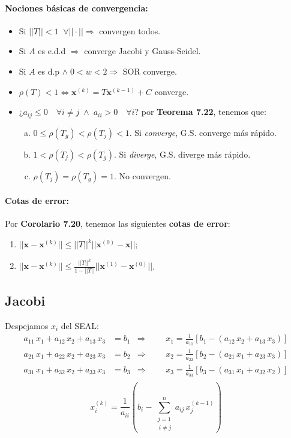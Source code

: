\documentclass[10pt,a4paper]{article}
\begin{document}
\paragraph{Nociones básicas de convergencia:}
\begin{itemize}
\item Si $||T||<1 \;\; \forall ||\cdot|| \Rightarrow$ convergen todos.
\item Si $A$ es e.d.d $\Rightarrow$ converge Jacobi y Gauss-Seidel.
\item Si $A$ es d.p $\wedge\; 0<w<2 \Rightarrow$ SOR converge.
\item $\rho (T) < 1 \iff \mathbf{x}^{(k)}=T\mathbf{x}^{(k-1)} + C$ converge. 
\item ¿$a_{ij} \leq 0 \quad \forall i\neq j \; \wedge \; a_{ii}>0 \quad \forall i$? por \textbf{Teorema 7.22}, tenemos que:
\begin{enumerate}[a.]
\item $0 \leq \rho(T_g) < \rho(T_j)<1$. Si \textit{converge}, G.S. converge más rápido.
\item $1 < \rho(T_j) < \rho (T_g)$. Si \textit{diverge}, G.S. diverge más rápido.
\item $\rho(T_j) = \rho(T_g) = 1$. No convergen.
\end{enumerate}
\end{itemize}

\paragraph{Cotas de error:}
Por \textbf{Corolario 7.20}, tenemos las siguientes \textbf{cotas de error}:
\begin{enumerate}
\item $||\mathbf{x} - \mathbf{x}^{(k)}|| \leq ||T||^{k} ||\mathbf{x}^{(0)}-\mathbf{x}||$;
\item $||\mathbf{x} - \mathbf{x}^{(k)}|| \leq \frac{||T||^{k}}{1-||T||} ||\mathbf{x}^{(1)}-\mathbf{x}^{(0)}||$.
\end{enumerate}

\subsection{Jacobi}

Despejamos $x_i$ del SEAL:
\begin{align*}
a_{11} \, x_1 + a_{12} \, x_2 + a_{13} \, x_3 &= b_1 &\Rightarrow &
&& x_1 = \frac{1}{a_{11}} \left[b_1 - (a_{12} \, x_2 + a_{13}\,x_3)\right]\\
a_{21} \, x_1 + a_{22} \, x_2 + a_{23} \, x_3 &= b_2 &\Rightarrow &
&& x_2 = \frac{1}{a_{22}} \left[b_2 - (a_{21} \, x_1 + a_{23}\,x_3)\right]\\
a_{31} \, x_1 + a_{32} \, x_2 + a_{33} \, x_3 &= b_3 &\Rightarrow &
&& x_3 = \frac{1}{a_{33}} \left[b_3 - (a_{31} \, x_1 + a_{32}\,x_2)\right]\\
\end{align*}
\[x_i^{(k)} = \frac{1}{a_{ii}} \left(b_i - \sum_{\substack{j=1 \\\ i \neq j}}^{n} a_{ij} \, x_j^{(k-1)} \right) \]
\end{document}
